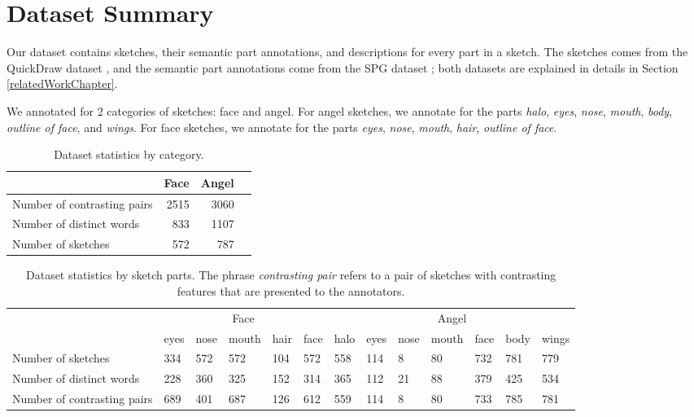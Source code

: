 \section{Dataset Summary} \label{datasummary}
Our dataset contains sketches, their semantic part annotations, and descriptions for every part in a sketch. 
The sketches comes from the QuickDraw dataset \citep{ha2017neural}, and the semantic part annotations come from the SPG dataset \citep{spg_paper}; both datasets are explained in details in Section \ref{relatedWorkChapter}.

We annotated for 2 categories of sketches: face and angel. 
For angel sketches, we annotate for the parts \textit{halo}, \textit{eyes}, \textit{nose}, \textit{mouth}, \textit{body}, \textit{outline of face}, and \textit{wings}. 
For face sketches, we annotate for the parts \textit{eyes}, \textit{nose}, \textit{mouth}, \textit{hair}, \textit{outline of face}. 


\begin{table}[!htb]
\begin{minipage}{1\textwidth}
\begin{center}
{\small
\begin{tabular}{lrrr}
\toprule
~ & Face & Angel \\
\midrule
Number of contrasting pairs & 2515 & 3060 \\
Number of distinct words & 833 & 1107 \\
Number of sketches & 572 & 787 \\
\bottomrule
\end{tabular}}
\caption{Dataset statistics by category.}
\label{table:dataset_stats1}
\end{center}
\end{minipage}
\end{table}

\begin{table}[!htb]
\begin{minipage}{1\textwidth}
\begin{center}
{\small
\begin{tabular}{p{9em} | p{1.5em}p{1.5em}p{2em}p{1.5em}p{1.5em} | p{1.5em}p{1.5em}p{1.5em}p{2em}p{1.5em}p{1.5em}p{1.5em} }
\toprule
~ & \multicolumn{5}{c}{Face} & \multicolumn{7}{c}{Angel}\\
~ & eyes & nose & mouth & hair & face & halo & eyes & nose & mouth & face & body & wings  \\
\midrule
Number of sketches & 
334 & 572 & 572 & 104 & 572 &
558 & 114 & 8 & 80 & 732 & 781 & 779 \\
Number of distinct words & 
228 & 360 & 325 & 152 & 314 & 
365 & 112 & 21 & 88 & 379 & 425 & 534 \\
Number of contrasting pairs &
689 & 401 & 687 & 126 & 612 &
559 & 114 & 8 & 80 & 733 & 785 & 781 \\
\bottomrule
\end{tabular}}
\caption{Dataset statistics by sketch parts. The phrase \textit{contrasting pair} refers to a pair of sketches with contrasting features that are presented to the annotators.}
\label{table:dataset_stats_byparts}
\end{center}
\end{minipage}
\end{table}

